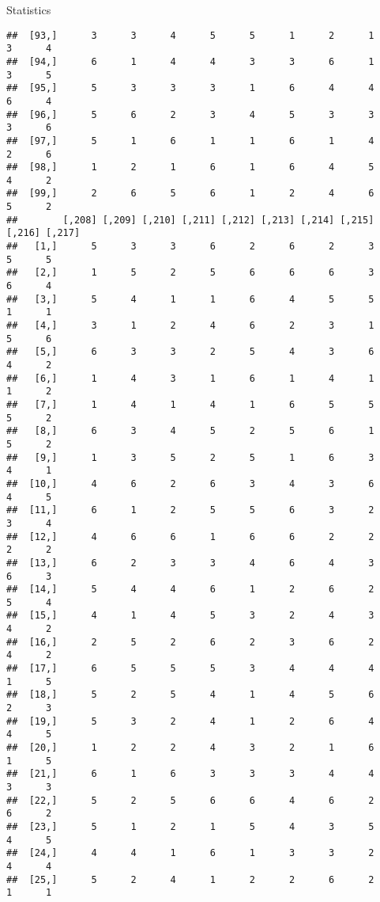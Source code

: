 \documentclass[
  ignorenonframetext,
]{beamer}
\begin{document}
\begin{frame}[fragile]{Statistics}
\begin{verbatim}
##  [93,]      3      3      4      5      5      1      2      1      3      4
##  [94,]      6      1      4      4      3      3      6      1      3      5
##  [95,]      5      3      3      3      1      6      4      4      6      4
##  [96,]      5      6      2      3      4      5      3      3      3      6
##  [97,]      5      1      6      1      1      6      1      4      2      6
##  [98,]      1      2      1      6      1      6      4      5      4      2
##  [99,]      2      6      5      6      1      2      4      6      5      2
##        [,208] [,209] [,210] [,211] [,212] [,213] [,214] [,215] [,216] [,217]
##   [1,]      5      3      3      6      2      6      2      3      5      5
##   [2,]      1      5      2      5      6      6      6      3      6      4
##   [3,]      5      4      1      1      6      4      5      5      1      1
##   [4,]      3      1      2      4      6      2      3      1      5      6
##   [5,]      6      3      3      2      5      4      3      6      4      2
##   [6,]      1      4      3      1      6      1      4      1      1      2
##   [7,]      1      4      1      4      1      6      5      5      5      2
##   [8,]      6      3      4      5      2      5      6      1      5      2
##   [9,]      1      3      5      2      5      1      6      3      4      1
##  [10,]      4      6      2      6      3      4      3      6      4      5
##  [11,]      6      1      2      5      5      6      3      2      3      4
##  [12,]      4      6      6      1      6      6      2      2      2      2
##  [13,]      6      2      3      3      4      6      4      3      6      3
##  [14,]      5      4      4      6      1      2      6      2      5      4
##  [15,]      4      1      4      5      3      2      4      3      4      2
##  [16,]      2      5      2      6      2      3      6      2      4      2
##  [17,]      6      5      5      5      3      4      4      4      1      5
##  [18,]      5      2      5      4      1      4      5      6      2      3
##  [19,]      5      3      2      4      1      2      6      4      4      5
##  [20,]      1      2      2      4      3      2      1      6      1      5
##  [21,]      6      1      6      3      3      3      4      4      3      3
##  [22,]      5      2      5      6      6      4      6      2      6      2
##  [23,]      5      1      2      1      5      4      3      5      4      5
##  [24,]      4      4      1      6      1      3      3      2      4      4
##  [25,]      5      2      4      1      2      2      6      2      1      1

\end{verbatim}
\end{frame}
\end{document}

